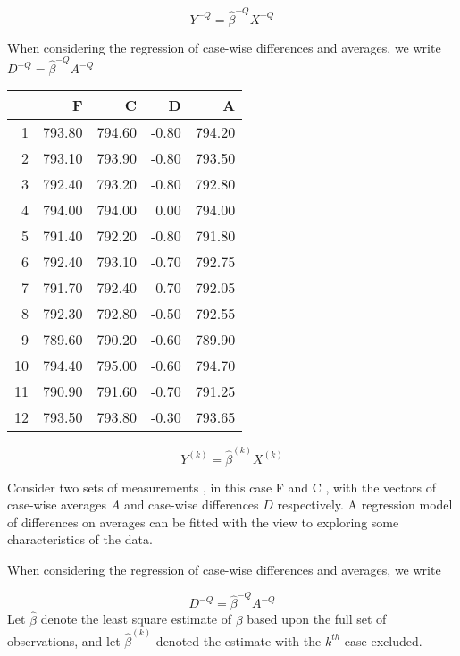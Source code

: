 \documentclass[12pt, a4paper]{article}
\begin{document}
\begin{equation}
Y^{-Q} = \hat{\beta}^{-Q}X^{-Q}
\end{equation}

When considering the regression of case-wise differences and averages, we write $D^{-Q} = \hat{\beta}^{-Q}A^{-Q}$


\begin{table}[ht]
	\begin{center}
		\begin{tabular}{rrrrr}
			\hline
			& F & C & D & A \\
			\hline
			1 & 793.80 & 794.60 & -0.80 & 794.20 \\
			2 & 793.10 & 793.90 & -0.80 & 793.50 \\
			3 & 792.40 & 793.20 & -0.80 & 792.80 \\
			4 & 794.00 & 794.00 & 0.00 & 794.00 \\
			5 & 791.40 & 792.20 & -0.80 & 791.80 \\
			6 & 792.40 & 793.10 & -0.70 & 792.75 \\
			7 & 791.70 & 792.40 & -0.70 & 792.05 \\
			8 & 792.30 & 792.80 & -0.50 & 792.55 \\
			9 & 789.60 & 790.20 & -0.60 & 789.90 \\
			10 & 794.40 & 795.00 & -0.60 & 794.70 \\
			11 & 790.90 & 791.60 & -0.70 & 791.25 \\
			12 & 793.50 & 793.80 & -0.30 & 793.65 \\
			\hline
		\end{tabular}
	\end{center}
\end{table}

\begin{equation}
Y^{(k)} = \hat{\beta}^{(k)}X^{(k)}
\end{equation}

Consider two sets of measurements , in this case F and C , with the vectors of case-wise averages $A$ and case-wise differences $D$ respectively. A regression model of differences on averages can be fitted with the view to exploring some characteristics of the data.

When considering the regression of case-wise differences and averages, we write

\begin{equation}
D^{-Q} = \hat{\beta}^{-Q}A^{-Q}
\end{equation}
Let $\hat{\beta}$ denote the least square estimate of $\beta$ based upon the full set of observations, and let $\hat{\beta}^{(k)}$ denoted the estimate with the $k^{th}$ case excluded.
\end{document}
